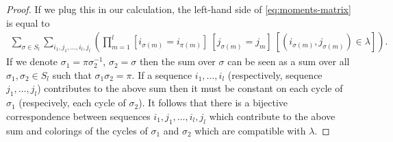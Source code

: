\documentclass[12pt]{amsart}
\theoremstyle{plain}
\theoremstyle{remark}
\newcommand{\N}{\mathbb{N}}
\newcommand{\E}{\mathbb{E}}
\DeclareMathOperator{\Tr}{Tr}
\begin{document}
\begin{proof}
If we plug this in our calculation, the left-hand side of \eqref{eq:moments-matrix} is equal to
\begin{multline*}
\sum_{\sigma \in S_l} \sum_{i_1,j_1,\ldots,i_l,j_l} \left( \prod_{m=1}^l
[i_{\sigma(m)}=i_{\pi(m)}] \  [j_{\sigma(m)}=j_m] \
[(i_{\sigma(m)},j_{\sigma(m)}) \in \lambda] \right).
\end{multline*}
If we denote $\sigma_1=\pi \sigma_2^{-1} $, $\sigma_2=\sigma$ then the sum over
$\sigma$ can be seen as a sum over all $\sigma_1,\sigma_2\in S_l$ such that
$\sigma_1\sigma_2=\pi$. If a sequence $i_1,\dots,i_l$ (respectively,
sequence $j_1,\dots,j_l$) contributes to the above sum then it must be constant
on each cycle of $\sigma_1$ (respecively, each cycle of $\sigma_2$). It follows
that there is a bijective correspondence between sequences
$i_1,j_1,\dots,i_l,j_l$ which contribute to the above sum and colorings of the
cycles of $\sigma_1$ and $\sigma_2$ which are compatible with $\lambda$.
\end{proof}
\end{document}
